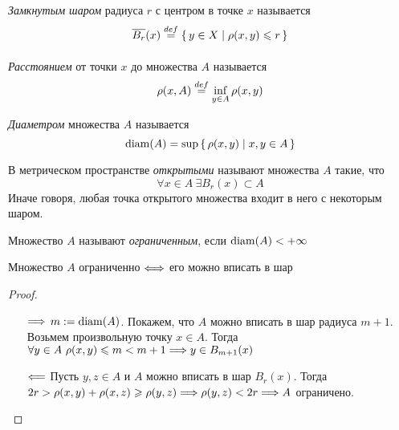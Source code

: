 \begin{definition}
    \textit{Замкнутым шаром} радиуса $r$ с центром в точке $x$ называется
\[
    \overline{B_r}(x) \overset{def}{\underset{}{=}} \{\, y \in X \mid \rho(x, y) \leqslant r \,\}
\]
\end{definition}

\begin{definition}
    \textit{Расстоянием} от точки $x$ до множества $A$ называется
\[
    \rho(x, A) \overset{def}{\underset{}{=}} \inf_{y \in A}{\rho(x, y)}
\]
\end{definition}

\begin{definition}
    \textit{Диаметром} множества $A$ называется
\[
    \operatorname{diam}(A) = \sup{\{\, \rho(x, y) \mid x, y \in A \,\}}
\]
\end{definition}

\begin{definition}
    В метрическом пространстве \textit{открытыми} называют множества $A$
    такие, что
\[
    \forall x \in A~ \exists B_r(x) \subset A
\]
Иначе говоря, любая точка открытого множества входит в него с некоторым шаром.
\end{definition}

\begin{definition}
    Множество $A$ называют \textit{ограниченным}, если $\operatorname{diam}(A) < +\infty$
\end{definition}

\begin{theorem}
    Множество $A$ ограниченно $\Longleftrightarrow$ его можно вписать в шар
\end{theorem}
\begin{proof}
    \enewline
    \begin{itemize}
        \item[$\Longrightarrow$] $m := \operatorname{diam}(A)$. Покажем, что $A$ можно вписать в
        шар радиуса $m + 1$. Возьмем произвольную точку $x \in A$. Тогда
        $\forall y \in A~\rho(x, y) \leqslant m < m + 1 \Longrightarrow y \in B_{m+1}(x)$
        \item[$\Longleftarrow$] Пусть $y, z \in A$ и $A$ можно вписать в шар $B_r(x)$.
        Тогда $2r > \rho(x, y) + \rho(x, z) \geqslant \rho(y, z) \Longrightarrow \rho(y, z)
        < 2r \Longrightarrow A$ ограничено.
    \end{itemize}
\end{proof}

